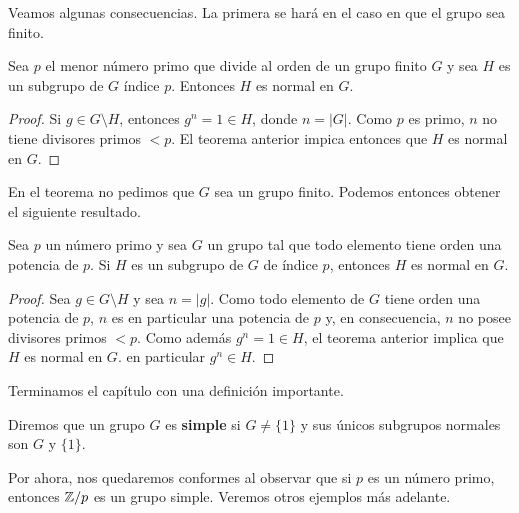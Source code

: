 Veamos algunas consecuencias. La primera se hará en el caso en que el grupo sea finito. 

\begin{corollary}
\label{cor:p_menor}
	Sea $p$ el menor número primo que divide al orden de un grupo finito  
	$G$ y sea $H$ es un subgrupo de $G$ índice $p$. Entonces $H$ es normal en $G$. 
\end{corollary}

\begin{proof}
	Si $g\in G\setminus H$, entonces $g^n=1\in H$, donde $n=|G|$. Como $p$ es primo, $n$ no tiene divisores primos $<p$. El teorema anterior impica entonces que $H$ es normal en $G$. 
\end{proof}

En el teorema no pedimos que $G$ sea un grupo finito. Podemos entonces obtener el siguiente resultado.

\begin{corollary}
Sea $p$ un número primo y sea $G$ un grupo tal que todo elemento tiene orden una potencia de $p$. Si $H$ es un subgrupo de $G$ de índice $p$, entonces $H$ es normal en $G$.  
\end{corollary}

\begin{proof}
Sea $g\in G\setminus H$ y sea $n=|g|$. Como todo elemento de $G$ tiene orden una potencia de $p$, 
$n$ es en particular una potencia de $p$ y, en consecuencia, $n$ no posee divisores primos $<p$. Como además $g^n=1\in H$, el teorema anterior implica que $H$ es normal en $G$. 
en particular $g^n\in H$.  	
\end{proof}

Terminamos el capítulo con una definición importante. 

\begin{definition}
Diremos que un grupo $G$ es \textbf{simple} si $G\ne\{1\}$ y sus únicos subgrupos normales
son $G$ y $\{1\}$.
\end{definition}

Por ahora, nos quedaremos conformes al observar que si $p$ es un número primo, entonces $\mathbb{Z}/p$ es un grupo simple. Veremos otros ejemplos más adelante.  


